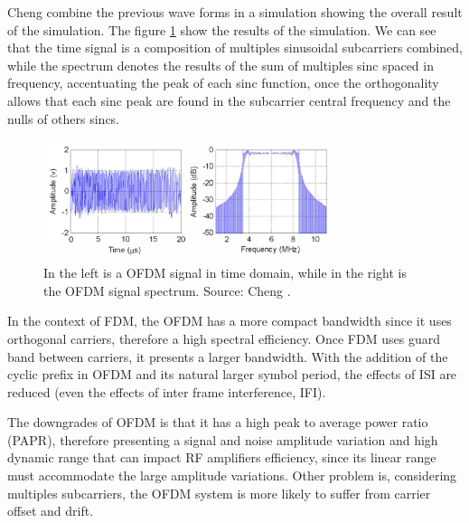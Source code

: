 Cheng \cite{ref9} combine the previous wave forms in a simulation showing the overall result of the simulation. The figure \ref{fig:cheng} show the results of the simulation. We can see that the time signal is a composition of multiples sinusoidal subcarriers combined, while the spectrum denotes the results of the sum of multiples sinc spaced in frequency, accentuating the peak of each sinc function, once the orthogonality allows that each sinc peak are found in the subcarrier central frequency and the nulls of others sincs.

\begin{figure}[h]
\begin{center}
\includegraphics[width=8.5cm]{images/chi_ofdm.png}
\caption{In the left is a OFDM signal in time domain, while in the right is the OFDM signal spectrum. Source: Cheng \cite{ref9}.}
\label{fig:cheng} 
\end{center}
\end{figure}
 
 In the context of FDM, the OFDM has a more compact bandwidth since it uses orthogonal carriers, therefore a high spectral efficiency. Once FDM uses guard band between carriers, it presents a larger bandwidth. With the addition of the cyclic prefix in OFDM and its natural larger symbol period, the effects of ISI are reduced (even the effects of inter frame interference, IFI). 
 
 The downgrades of OFDM is that it has a high peak to average power ratio (PAPR), therefore presenting a signal and noise amplitude variation and high dynamic range that can impact RF amplifiers efficiency, since its linear range must accommodate the large amplitude variations. Other problem is, considering multiples subcarriers, the OFDM system is more likely to suffer from carrier offset and drift.
